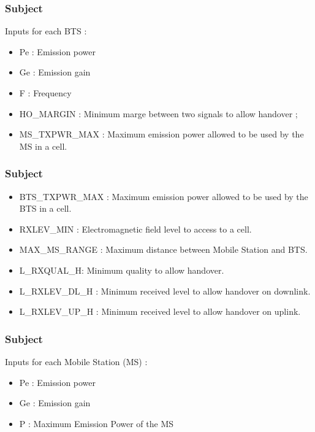 \documentclass{beamer}
\begin{document}
\begin{frame}
\frametitle{Subject}
Inputs for each BTS :
\begin{itemize}
  \item Pe : Emission power
  \item Ge : Emission gain
  \item F : Frequency
  \item HO\_MARGIN : Minimum marge between two signals to allow handover ;
  \item MS\_TXPWR\_MAX : Maximum emission power allowed to be used by the MS in a cell.
\end{itemize}

\end{frame}
\begin{frame}
\frametitle{Subject}
\begin{itemize}
  \item BTS\_TXPWR\_MAX : Maximum emission power allowed to be used by the BTS in a cell.
  \item RXLEV\_MIN : Electromagnetic field level to access to a cell.
  \item MAX\_MS\_RANGE : Maximum distance between Mobile Station and BTS.
  \item L\_RXQUAL\_H: Minimum quality to allow handover.
  \item L\_RXLEV\_DL\_H : Minimum received level to allow handover on downlink.
  \item L\_RXLEV\_UP\_H : Minimum received level to allow handover on uplink.
\end{itemize}
\end{frame}
\begin{frame}
\frametitle{Subject}
Inputs for each Mobile Station (MS) :
\begin{itemize}
  \item Pe : Emission power
  \item Ge : Emission gain
  \item P : Maximum Emission Power of the MS
\end{itemize}

\end{frame}
\end{document}
